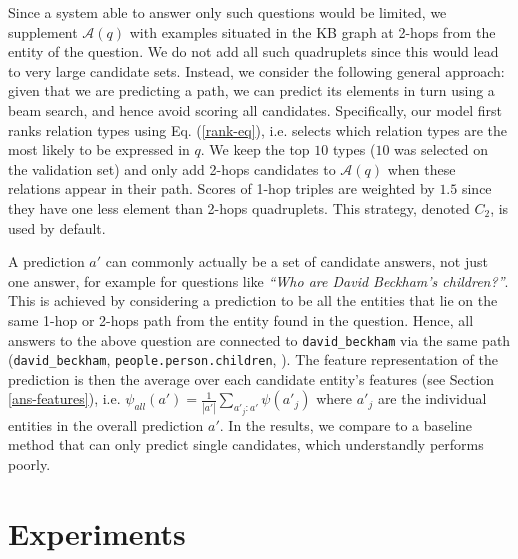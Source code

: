 \documentclass[runningheads,a4paper]{llncs}
\newcommand{\ent}[1]{{\small {\tt #1}}}
\begin{document}
Since a system able to answer only such questions would be limited, we
supplement $\mathcal{A}(q)$ with examples situated in the KB graph at
2-hops from the entity of the question. We do not add all such
quadruplets since this would lead to very large candidate sets. Instead,
we consider the following general approach: given that we are
predicting a path, we can predict its elements in turn using a beam
search, and hence avoid scoring all candidates.
Specifically, our model first ranks relation types using
Eq. (\ref{rank-eq}), i.e.  selects which relation types are the most
likely to be expressed in $q$. We keep the top $10$ types ($10$ was
selected on the validation set) and only add 2-hops candidates to
$\mathcal{A}(q)$ when these relations appear in their path. Scores of
1-hop triples are weighted by $1.5$ since they have one less
element than 2-hops quadruplets.  This strategy, denoted $C_2$, is used by
default.


A prediction $a'$ can commonly actually be a set of candidate answers,
not just one answer, for example for questions like {\em ``Who are David
Beckham's children?''}. This is achieved by considering a prediction to
be all the entities that lie on the same 1-hop or 2-hops path from the
entity found in the question. 
Hence, all answers to the above question are connected to
\ent{david\_beckham} via the same path (\ent{david\_beckham},
\ent{people.person.children}, \ent{*}).
The feature representation of the prediction is then the average over
each candidate entity's features (see Section \ref{ans-features}),
i.e. $\psi_{all}(a') = \frac{1}{|a'|} \sum_{a'_j : a'} \psi(a'_j)$
where $a'_j$ are the individual entities in the overall prediction
$a'$. In the results, we compare to a baseline method that can only
predict single candidates, which understandly performs poorly.



\section{Experiments} 
\end{document}
